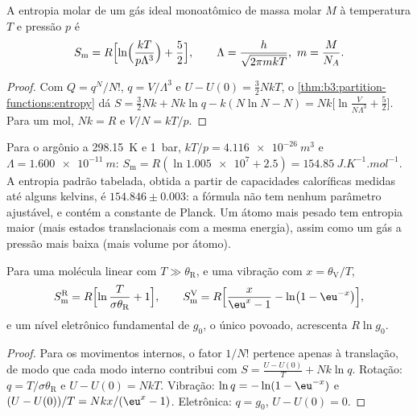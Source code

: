 \begin{theorem}\label{thm:b3:partition-functions:sackur-tetrode}
A entropia molar de um gás ideal monoatômico de massa molar $M$ à temperatura $T$
e pressão $p$ é
\[
  S_{\mathrm m} = R\Bigl[\ln\Bigl(\frac{kT}{p\Lambda^3}\Bigr) + \frac52\Bigr],
  \qquad \Lambda = \frac{h}{\sqrt{2\pi mkT}},\ m = \frac{M}{N_A}.
\]
\end{theorem}

\begin{proof}
Com $Q = q^N/N!$, $q = V/\Lambda^3$ e $U - U(0) = \frac32NkT$, o
\cref{thm:b3:partition-functions:entropy} dá $S = \frac32Nk + Nk\ln q - k(N\ln N - N) =
Nk\bigl[\ln\frac{V}{N\Lambda^3} + \frac52\bigr]$. Para um mol, $Nk = R$ e $V/N = kT/p$.
\end{proof}

Para o argônio a \qty{298.15}{K} e \qty{1}{bar}, $kT/p = \qty{4.116e-26}{m^3}$ e $\Lambda =
\qty{1.600e-11}{m}$: $S_{\mathrm m} = R(\ln\num{1.005e7} + 2.5) = \qty{154.85}{J.K^{-1}.mol^{-1}}$. A
entropia padrão tabelada, obtida a partir de capacidades caloríficas medidas
até alguns kelvins, é $154.846 \pm 0.003$: a fórmula não tem nenhum parâmetro
ajustável, e contém a constante de Planck. Um átomo mais pesado tem entropia
maior (mais estados translacionais com a mesma energia), assim como um gás a
pressão mais baixa (mais volume por átomo).

\begin{proposition}\label{prop:b3:partition-functions:modes-entropy}
Para uma molécula linear com $T \gg \theta_{\mathrm R}$, e uma vibração com $x = \theta_{\mathrm V}/T$,
\[
  S^{\mathrm R}_{\mathrm m} = R\Bigl[\ln\frac{T}{\sigma\theta_{\mathrm R}} + 1\Bigr],
  \qquad
  S^{\mathrm V}_{\mathrm m} = R\Bigl[\frac{x}{\eu^x - 1} - \ln\bigl(1 - \eu^{-x}\bigr)\Bigr],
\]
e um nível eletrônico fundamental de  $g_0$, o único povoado, acrescenta $R\ln g_0$.
\end{proposition}

\begin{proof}
Para os movimentos internos, o fator $1/N!$ pertence apenas à translação, de modo
que cada modo interno contribui com $S = \frac{U - U(0)}{T} + Nk\ln q$. Rotação:
$q = T/\sigma\theta_{\mathrm R}$ e $U - U(0) = NkT$. Vibração: $\ln q = -\ln(1 - \eu^{-x})$ e
$(U - U(0))/T = Nkx/(\eu^x - 1)$. Eletrônica: $q = g_0$, $U - U(0) = 0$.
\end{proof}


